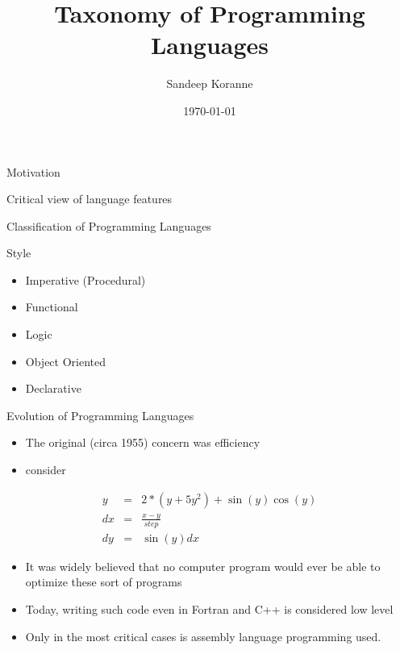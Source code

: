 \documentclass[bigger]{beamer}
\author{Sandeep Koranne}
\date{\today}
\title{Taxonomy of Programming Languages}
\begin{document}
\maketitle

\begin{frame}[label=sec-1]{Motivation}
\pause
\begin{block}{Critical view of language features}
\end{block}
\end{frame}

\begin{frame}[label=sec-2]{Classification of Programming Languages}
\begin{block}{Style}
\begin{itemize}[<+->]
\item Imperative (Procedural)
\item Functional
\item Logic
\item Object Oriented
\item Declarative
\end{itemize}
\end{block}
\end{frame}

\begin{frame}[label=sec-3]{Evolution of Programming Languages}
\begin{itemize}[<+->]
\item The original (circa 1955) concern was efficiency
\item consider
\end{itemize}
\begin{eqnarray}
y & = & 2*(y+5y^2) + \sin(y)\cos(y) \\
dx & = & \frac{x-y}{step}\\
dy & = & \sin(y)dx
\end{eqnarray} 
\begin{itemize}
\item It was widely believed that no computer program would ever be able to optimize these sort of programs
\item Today, writing such code even in Fortran and C++ is considered low level
\item Only in the most critical cases is assembly language programming used.
\end{itemize}
\end{frame}
\end{document}

